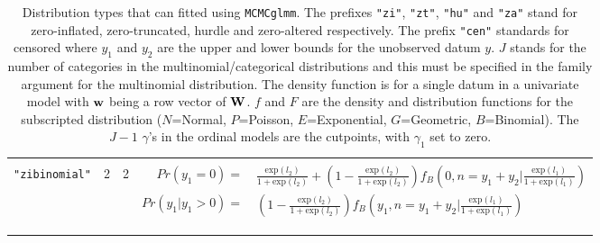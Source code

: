 \documentclass{article}
\begin{document}
\begin{landscape}
\begin{longtable}{cccrl}
&&&&\\
   \texttt{"zibinomial"}        &  2  &   2  &     $Pr(y_{1}=0) =$&$ \frac{\textrm{exp}(l_{2})}{1+\textrm{exp}(l_{2})}+\left(1-\frac{\textrm{exp}(l_{2})}{1+\textrm{exp}(l_{2})}\right)f_{B}(0, n=y_{1}+y_{2}|\frac{\textrm{exp}(l_{1})}{1+\textrm{exp}(l_{1})})$\\     
                               &    &       & $Pr(y_{1} | y_{1}>0) =$&$ \left(1-\frac{\textrm{exp}(l_{2})}{1+\textrm{exp}(l_{2})}\right)f_{B}(y_{1}, n=y_{1}+y_{2}|\frac{\textrm{exp}(l_{1})}{1+\textrm{exp}(l_{1})})$\\      
&&&&\\
\hline\\
\caption{\footnotesize{Distribution types that can fitted using \texttt{MCMCglmm}.  The prefixes \texttt{"zi"}, \texttt{"zt"}, \texttt{"hu"} and \texttt{"za"} stand for zero-inflated, zero-truncated, hurdle and zero-altered respectively. The prefix \texttt{"cen"} standards for censored where $y_{1}$  and $y_{2}$ are the upper and lower bounds for the unobserved datum $y$. $J$ stands for the number of categories in the multinomial/categorical distributions and this must be specified in the family argument for the multinomial distribution. The density function is for a single datum in a univariate model with ${\bf w}$ being a row vector of ${\bf W}$.  $f$ and $F$ are the density and distribution functions for the subscripted distribution ($N$=Normal, $P$=Poisson, $E$=Exponential, $G$=Geometric, $B$=Binomial). The $J-1$ $\gamma$'s in the ordinal models are the cutpoints, with $\gamma_{1}$ set to zero.\label{dist-tab}}}
\end{longtable}
\end{landscape}


\ifalone
\end{document}
